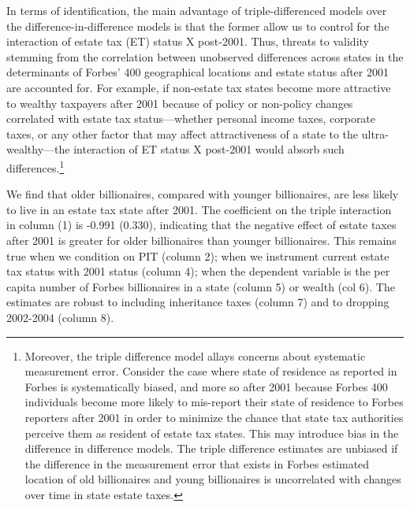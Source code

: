 \documentclass[12pt]{article}
\begin{document}
In terms of identification,  the main advantage of triple-differenced models over the difference-in-difference models is that the former allow us to control for the interaction of estate tax (ET) status X post-2001.  Thus, threats to validity stemming from the correlation between unobserved differences across states in the determinants of Forbes' 400 geographical locations and estate status after 2001 are accounted for. For example, if non-estate tax states become more attractive to wealthy taxpayers after 2001 because of policy or non-policy changes correlated with estate tax status---whether personal income taxes, corporate taxes, or any other factor that may affect attractiveness of a state to the ultra-wealthy---the interaction of ET status X post-2001 would absorb such differences.\footnote{Moreover,  the triple difference model allays   concerns about systematic measurement error. Consider the case where  state of residence as reported in Forbes is systematically biased, and more so  after 2001 because Forbes 400 individuals become more likely to mis-report their state of residence to Forbes reporters after 2001 in order to minimize the chance that state tax authorities perceive them as resident of estate tax states. This may introduce bias in the difference in difference models. The triple difference estimates are unbiased if the difference in the measurement error that exists in Forbes estimated location of old billionaires and young billionaires is uncorrelated with changes over time in state estate taxes.}     

We find that older billionaires, compared with younger billionaires, are less likely to live in an estate tax state after 2001.  The coefficient on the triple interaction in column (1) is -0.991 (0.330), indicating that the negative effect of estate taxes after 2001 is greater for older billionaires than younger billionaires. 
This remains true when we condition on PIT (column 2); when we instrument current estate tax status with 2001 status (column 4); when the dependent variable is the per capita number of Forbes billionaires in a state (column 5) or wealth (col 6).     
The estimates are robust to including inheritance taxes (column 7) and to dropping 2002-2004 (column 8). 
\end{document}
